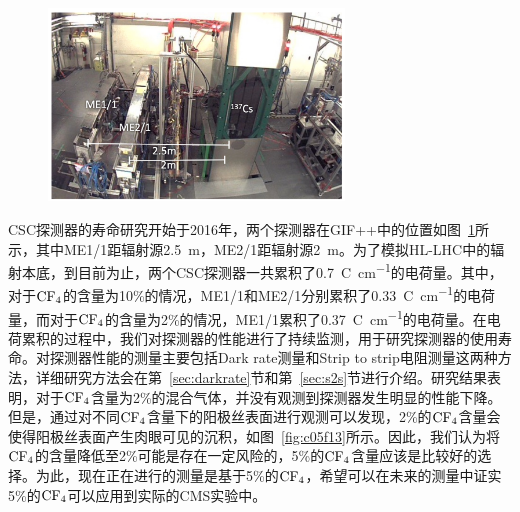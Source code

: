 \begin{figure}[!htbp]
    \centering
    \includegraphics[width=0.7\textwidth]{figures/chapter05/GIF_CSC.jpg}
    \label{fig:c05f12}
\end{figure}

CSC探测器的寿命研究开始于2016年，两个探测器在GIF++中的位置如图~\ref{fig:c05f12}所示，其中ME1/1距辐射源2.5~\si{\m}，ME2/1距辐射源2~\si{\m}。为了模拟HL-LHC中的辐射本底，到目前为止，两个CSC探测器一共累积了0.7~\si{{\coulomb\per\cm}}的电荷量。其中，对于$\mathrm{CF_4}$的含量为10\%的情况，ME1/1和ME2/1分别累积了0.33~\si{{\coulomb\per\cm}}的电荷量，而对于$\mathrm{CF_4}$的含量为2\%的情况，ME1/1累积了0.37~\si{{\coulomb\per\cm}}的电荷量。在电荷累积的过程中，我们对探测器的性能进行了持续监测，用于研究探测器的使用寿命。对探测器性能的测量主要包括Dark rate测量和Strip to strip电阻测量这两种方法，详细研究方法会在第~\ref{sec:darkrate}节和第~\ref{sec:s2s}节进行介绍。研究结果表明，对于$\mathrm{CF_4}$含量为2\%的混合气体，并没有观测到探测器发生明显的性能下降。但是，通过对不同$\mathrm{CF_4}$含量下的阳极丝表面进行观测可以发现，2\%的$\mathrm{CF_4}$含量会使得阳极丝表面产生肉眼可见的沉积，如图~\ref{fig:c05f13}所示。因此，我们认为将$\mathrm{CF_4}$的含量降低至2\%可能是存在一定风险的，5\%的$\mathrm{CF_4}$含量应该是比较好的选择。为此，现在正在进行的测量是基于5\%的$\mathrm{CF_4}$，希望可以在未来的测量中证实5\%的$\mathrm{CF_4}$可以应用到实际的CMS实验中。

